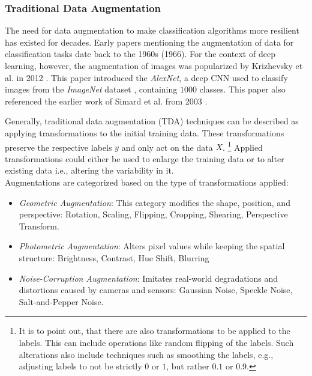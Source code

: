 \subsubsection[Traditional Data Augmentation - TDA]{Traditional Data Augmentation}\label{theoretical_tda}
The need for data augmentation to make classification algorithms more resilient has existed for decades. Early papers mentioning the augmentation of data for classification tasks date back to the 1960s \cite{Nagy1966} (1966). For the context of deep learning, however, the augmentation of images was popularized by Krizhevsky et al. in 2012 \cite{Krizhevsky2012traditionaldataaugmentation}. This paper introduced the \textit{AlexNet}, a deep CNN used to classify images from the \textit{ImageNet} dataset \cite{ImageNetDataset5206848}, containing $1 000$ classes. This paper also referenced the earlier work of Simard et al. from 2003 \cite{Simard2003bestpracticesforcnns}.

Generally, traditional data augmentation (TDA) techniques can be described as applying transformations to the initial training data. These transformations preserve the respective labels \(y\) and only act on the data \(X\). \footnote{It is to point out, that there are also transformations to be applied to the labels. This can include operations like random flipping of the labels. Such alterations also include techniques such as smoothing the labels, e.g., adjusting labels to not be strictly $0$ or $1$, but rather $0.1$ or $0.9$.} Applied transformations could either be used to enlarge the training data or to alter existing data i.e., altering the variability in it.\\

Augmentations are categorized based on the type of transformations applied:

\begin{itemize}
    \item \textit{Geometric Augmentation}: This category modifies the shape, position, and perspective: Rotation, Scaling, Flipping, Cropping, Shearing, Perspective Transform.
    \item \textit{Photometric Augmentation}: Alters pixel values while keeping the spatial structure: Brightness, Contrast, Hue Shift, Blurring
    \item \textit{Noise-Corruption Augmentation}: Imitates real-world degradations and distortions caused by cameras and sensors: Gaussian Noise, Speckle Noise, Salt-and-Pepper Noise.
\end{itemize}

